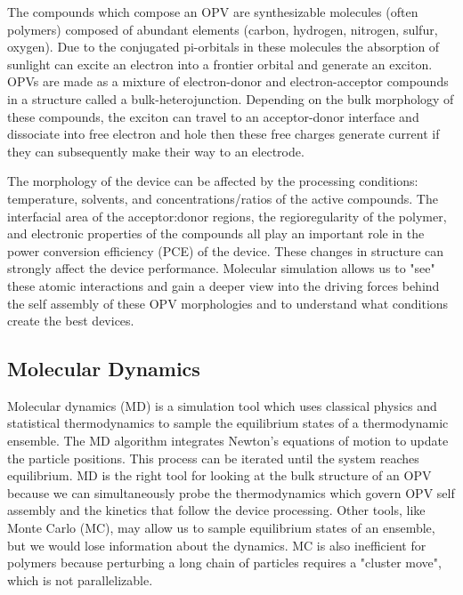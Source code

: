 The compounds which compose an OPV are synthesizable molecules (often polymers) composed of abundant elements (carbon, hydrogen, nitrogen, sulfur, oxygen).
Due to the conjugated pi-orbitals in these molecules the absorption of sunlight can excite an electron into a frontier orbital and generate an exciton.
OPVs are made as a mixture of electron-donor and electron-acceptor compounds in a structure called a bulk-heterojunction.
Depending on the bulk morphology of these compounds, the exciton can travel to an acceptor-donor interface and dissociate into free electron and hole then these free charges generate current if they can subsequently make their way to an electrode.

The morphology of the device can be affected by the processing conditions: temperature, solvents, and concentrations/ratios of the active compounds\cite{Ma2005,Hoppe2004a,Li2007}.
The interfacial area of the acceptor:donor regions\cite{Mazzio2015}, the regioregularity of the polymer\cite{Kim2006}, and electronic properties of the compounds\cite{Scharber2006a} all play an important role in the power conversion efficiency (PCE) of the device. 
These changes in structure can strongly affect the device performance.
Molecular simulation allows us to "see" these atomic interactions and gain a deeper view into the driving forces behind the self assembly of these OPV morphologies and to understand what conditions create the best devices.

\subsection*{Molecular Dynamics}
Molecular dynamics (MD) is a simulation tool which uses classical physics and statistical thermodynamics to sample the equilibrium states of a thermodynamic ensemble.
The MD algorithm integrates Newton's equations of motion to update the particle positions.
This process can be iterated until the system reaches equilibrium.
MD is the right tool for looking at the bulk structure of an OPV because we can simultaneously probe the thermodynamics which govern OPV self assembly and the kinetics that follow the device processing.
Other tools, like Monte Carlo (MC), may allow us to sample equilibrium states of an ensemble, but we would lose information about the dynamics.
MC is also inefficient for polymers because perturbing a long chain of particles requires a "cluster move", which is not parallelizable.

